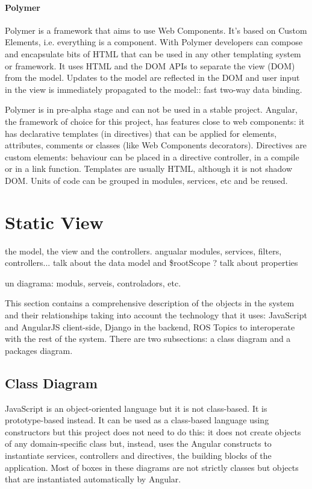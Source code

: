 \paragraph{Polymer} Polymer is a framework that aims to use Web Components. 
It's based on Custom Elements, i.e. everything is a component.
With Polymer developers can compose and encapsulate bits of HTML that can be used in any other templating system or framework.
It uses \ac{HTML} and the \ac{DOM} \acp{API} to separate the view (\ac{DOM}) from the model. 
Updates to the model are reflected in the \ac{DOM} and user input in the view is immediately propagated to the model:: fast two-way data binding.

Polymer is in pre-alpha stage and can not be used in a stable project.
Angular, the framework of choice for this project, has features close to web components: it has declarative templates (in directives) that can be applied for elements, attributes, comments or classes (like Web Components decorators).
Directives are custom elements: behaviour can be placed in a directive controller, in a compile or in a link function.
Templates are usually \ac{HTML}, although it is not shadow \ac{DOM}.
Units of code can be grouped in modules, services, etc and be reused.

\FloatBarrier

\section{Static View}
the model, the view and the controllers. angualar modules, services, filters, controllers...
talk about the data model and \$rootScope ? talk about properties

un diagrama:
moduls, serveis, controladors, etc. 

This section contains a comprehensive description of the objects in the system and their relationships taking into account the technology that it uses: JavaScript and AngularJS client-side, Django in the backend, \ac{ROS} Topics to interoperate with the rest of the system.
There are two subsections: a class diagram and a packages diagram.

\subsection{Class Diagram}
JavaScript is an object-oriented language but it is not class-based.
It is prototype-based instead.
It can be used as a class-based language using constructors but this project does not need to do this: it does not create objects of any domain-specific class but, instead, uses the Angular constructs to instantiate services, controllers and directives, the building blocks of the application.
Most of boxes in these diagrams are not strictly classes but objects that are instantiated automatically by Angular.

